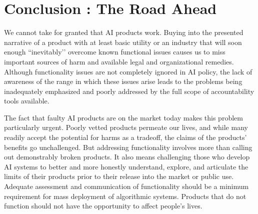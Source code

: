 \documentclass[acmconf,manuscript,screen,natbib=true]{acmart}
\begin{document}
\section{Conclusion : The Road Ahead}
We cannot take for granted that %
AI products work. 
Buying into the presented narrative of a product with at least basic utility or an industry that will soon enough ``inevitably’’ overcome known functional issues causes us to miss important sources of harm and available legal and organizational remedies.
Although functionality issues are not completely ignored in AI policy, the lack of awareness of the range in which these issues arise leads to the problems being inadequately emphasized and poorly addressed by the full scope of accountability tools available. 

The fact that faulty AI products are on the market today makes this problem particularly urgent. Poorly vetted products permeate our lives, and while many readily accept the potential for harms as a tradeoff, the claims of the products' benefits go unchallenged. But addressing functionality involves more than calling out demonstrably broken products. It also means challenging those who develop AI systems to better and more honestly understand, explore, and articulate the limits of their products prior to their release into the market or public use. %
Adequate assessment and communication of functionality should be a minimum requirement for mass deployment of algorithmic systems. Products that do not function should not have the opportunity to affect people's lives. %
\end{document}
